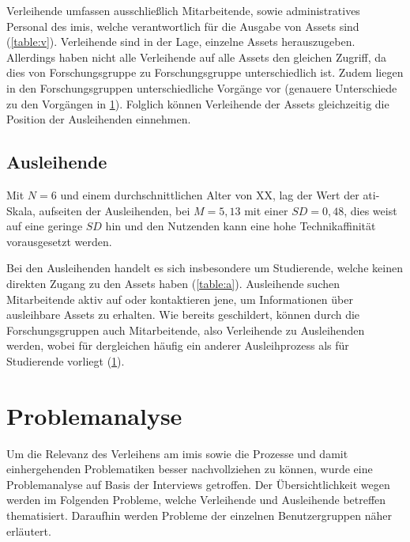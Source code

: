 Verleihende umfassen ausschließlich Mitarbeitende, sowie administratives Personal des \ac{imis},
welche verantwortlich für die Ausgabe von Assets sind (\ref{table:v}). Verleihende sind in der Lage,
einzelne Assets herauszugeben. Allerdings haben nicht alle Verleihende auf alle Assets den gleichen
Zugriff, da dies von Forschungsgruppe zu Forschungsgruppe unterschiedlich ist. Zudem liegen in den
Forschungsgruppen unterschiedliche Vorgänge vor (genauere Unterschiede zu den Vorgängen in
\ref{section:iststand}). Folglich können Verleihende der Assets gleichzeitig die Position der
Ausleihenden einnehmen.

\subsection{Ausleihende}

Mit $N=6$ und einem durchschnittlichen Alter von XX, lag der Wert der \ac{ati}-Skala, aufseiten der
Ausleihenden, bei $M=5,13$ mit einer $SD=0,48$, dies weist auf eine geringe $SD$ hin und den
Nutzenden kann eine hohe Technikaffinität vorausgesetzt werden.

Bei den Ausleihenden handelt es sich insbesondere um Studierende, welche keinen direkten Zugang zu
den Assets haben (\ref{table:a}). Ausleihende suchen Mitarbeitende aktiv auf oder kontaktieren jene,
um Informationen über ausleihbare Assets zu erhalten. Wie bereits geschildert, können durch die
Forschungsgruppen auch Mitarbeitende, also Verleihende zu Ausleihenden werden, wobei für dergleichen
häufig ein anderer Ausleihprozess als für Studierende vorliegt (\ref{section:iststand}). 

\section{Problemanalyse}
\label{section:iststand}
        
Um die Relevanz des Verleihens am \ac{imis} sowie die Prozesse und damit einhergehenden
Problematiken besser nachvollziehen zu können, wurde eine Problemanalyse auf Basis der Interviews
getroffen. Der Übersichtlichkeit wegen werden im Folgenden Probleme, welche Verleihende und
Ausleihende betreffen thematisiert. Daraufhin werden Probleme der einzelnen Benutzergruppen näher
erläutert.

